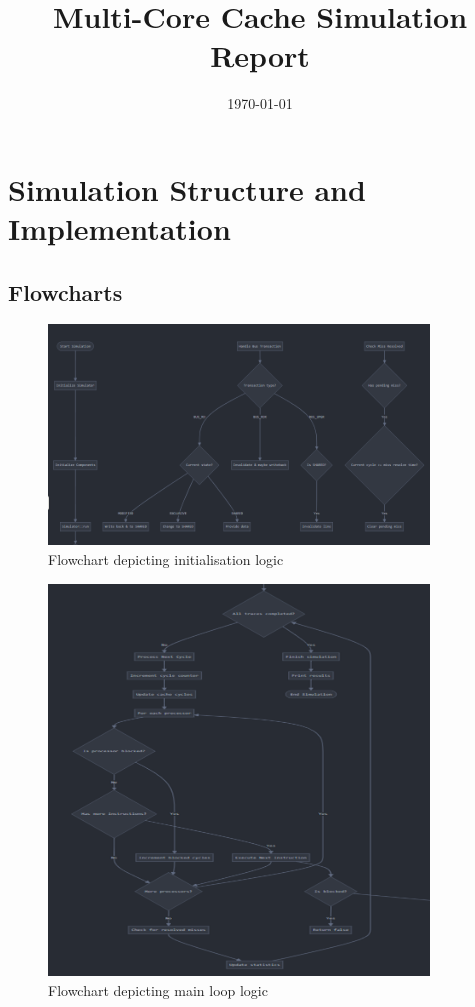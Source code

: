 \documentclass[12pt,a4paper]{article}
\title{Multi-Core Cache Simulation Report}
\author{} %
\date{\today}
\begin{document}
\maketitle
\tableofcontents
\newpage

\section{Simulation Structure and Implementation}

\subsection{Flowcharts}

\begin{figure}[H]
    \centering
    \includegraphics[width=0.9\textwidth]{image1.png}
    \caption{Flowchart depicting initialisation logic}
    \label{fig:init-logic}
\end{figure}

\begin{figure}[H]
    \centering
    \includegraphics[width=0.9\textwidth]{image2.png}
    \caption{Flowchart depicting main loop logic}
    \label{fig:main-loop}
\end{figure}
\end{document}
